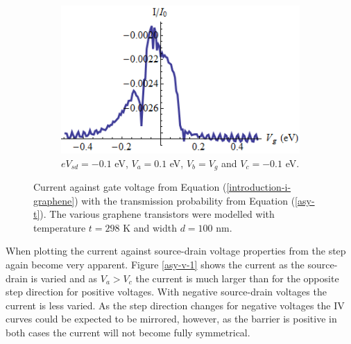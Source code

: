 \begin{figure}[h]
			\hspace{0.5cm}
			\begin{subfigure}[h]{0.3\textwidth}
				\centerline{\includegraphics[scale=0.35]{images/asy-vg-5}}
				\caption{$eV_{sd}=-0.1$ eV, $V_{a}=0.1$ eV, $V_{b}=V_{g}$ and $V_{c}=-0.1$ eV.}
			\end{subfigure}
			\caption{Current against gate voltage from Equation (\ref{introduction-i-graphene}) with the transmission probability from Equation (\ref{asy-t}). The various graphene transistors were modelled with temperature $t=298$ K and width $d=100$ nm.}
			\label{asy-vg-3}
		\end{figure}

		When plotting the current against source-drain voltage properties from the step again become very apparent. Figure \ref{asy-v-1} shows the current as the source-drain is varied and as $V_{a}>V_{c}$ the current is much larger than for the opposite step direction for positive voltages. With negative source-drain voltages the current is less varied. As the step direction changes for negative voltages the IV curves could be expected to be mirrored, however, as the barrier is positive in both cases the current will not become fully symmetrical. 

